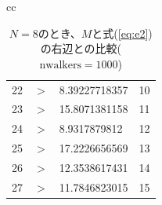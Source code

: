 \documentclass{jsarticle}
\begin{document}
\begin{enumerate}
\begin{enumerate}
\begin{table}[H]
\begin{center}
\begin{tabular}{cc}
\begin{minipage}{0.5\hsize}
\begin{center}
\begin{tabular}{rcl|c}
                                        22 & $>$ & 8.39227718357 & 10 \\
                                        23 & $>$ & 15.8071381158 & 11 \\
                                        24 & $>$ & 8.9317879812 & 12 \\
                                        25 & $>$ & 17.2226656569 & 13 \\
                                        26 & $>$ & 12.3538617431 & 14 \\
                                        27 & $>$ & 11.7846823015 & 15 \\ \hline
                                    \end{tabular}
                                    \caption{$N=8$のとき、$M$と式(\ref{eq:e2})の右辺との比較($\mathrm{nwalkers}=1000$)} 
                                    \label{t1}
                                    \end{center}
                                \end{minipage}
                                

\end{tabular}
\end{center}
\end{table}
\end{enumerate}
\end{enumerate}
\end{document}
